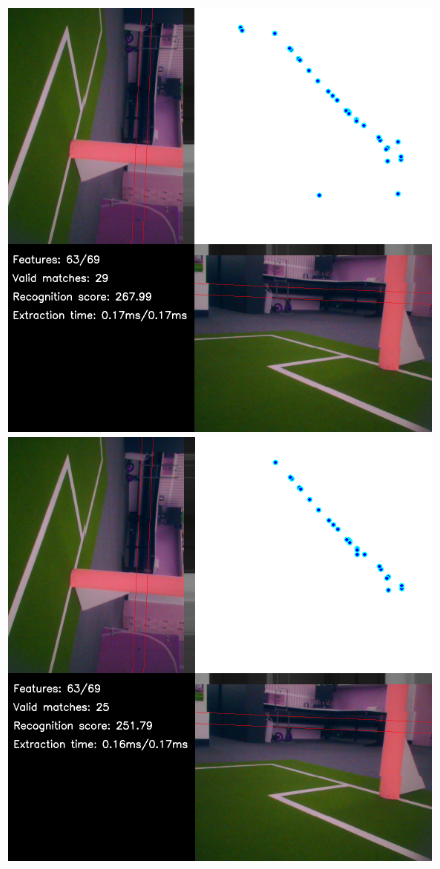\documentclass[runningheads,a4paper]{llncs}
\begin{document}
\begin{figure} [h]
\begin{minipage}[b]{0.5\textwidth}
\centering
\includegraphics[width=1\textwidth]{figures/NN.png}
\end{minipage}
\begin{minipage}[b]{0.5\textwidth}
\centering
\includegraphics[width=1\textwidth]{figures/NNR.png}

\end{minipage}
\end{figure}
\end{document}
